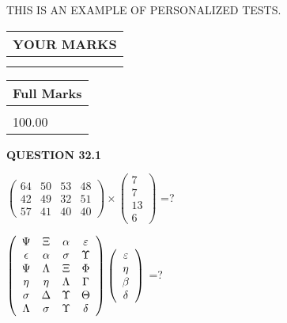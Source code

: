 \documentclass[12pt]{article}
\begin{document}
   
 \vspace{0.2in}
{\Huge  THIS IS AN EXAMPLE OF}
{\Huge  PERSONALIZED TESTS. }
   
   
  
\vspace{0.2in}
  
\noindent\begin{tabular}{|l|}
\hline
 YOUR MARKS  \\
\hline
 \\ 
 \\ 
\hline
\end{tabular}
\hspace{0.05in} \begin{tabular}{|l|}
\hline
 Full Marks  \\
\hline
 \\ 
100.00 \\
\hline
\end{tabular}
{\textbf{\Large{QUESTION
32.1 
}}}
  
  
 
$ \left( \begin{array}{ccccccccc}
          64  & 
          50  & 
          53  & 
          48  \\ 
          42  & 
          49  & 
          32  & 
          51  \\ 
          57  & 
          41  & 
          40  & 
          40
\end{array}\right) \times
\left( \begin{array}{c}
           7  \\ 
           7  \\ 
          13  \\ 
           6
\end{array}\right) $ =?
 
 
$  %
 \left( \begin{array}
 {
 c
 c
 c
 c
 }
 \Psi & 
                    \Xi & 
 \alpha & 
 \varepsilon \\ 
 \epsilon & 
 \alpha & 
 \sigma & 
 \Upsilon \\ 
 \Psi & 
 \Lambda & 
                    \Xi & 
 \Phi \\ 
 \eta & 
 \eta & 
 \Lambda & 
 \Gamma \\ 
 \sigma & 
 \Delta & 
 \Upsilon & 
 \Theta \\ 
 \Lambda & 
 \sigma & 
 \Upsilon & 
 \delta
 \end{array} \right)
 \left( \begin{array}
 {
 c
 }
 \varepsilon \\ 
 \eta \\ 
 \beta \\ 
 \delta
 \end{array} \right)
$ =?
 
\end{document}
